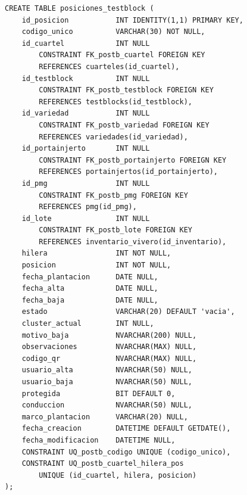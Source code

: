\documentclass[12pt,a4paper,twoside]{report}
\begin{document}
\begin{lstlisting}[style=sqlstyle, caption={posiciones\_testblock}]
CREATE TABLE posiciones_testblock (
    id_posicion           INT IDENTITY(1,1) PRIMARY KEY,
    codigo_unico          VARCHAR(30) NOT NULL,
    id_cuartel            INT NULL
        CONSTRAINT FK_postb_cuartel FOREIGN KEY
        REFERENCES cuarteles(id_cuartel),
    id_testblock          INT NULL
        CONSTRAINT FK_postb_testblock FOREIGN KEY
        REFERENCES testblocks(id_testblock),
    id_variedad           INT NULL
        CONSTRAINT FK_postb_variedad FOREIGN KEY
        REFERENCES variedades(id_variedad),
    id_portainjerto       INT NULL
        CONSTRAINT FK_postb_portainjerto FOREIGN KEY
        REFERENCES portainjertos(id_portainjerto),
    id_pmg                INT NULL
        CONSTRAINT FK_postb_pmg FOREIGN KEY
        REFERENCES pmg(id_pmg),
    id_lote               INT NULL
        CONSTRAINT FK_postb_lote FOREIGN KEY
        REFERENCES inventario_vivero(id_inventario),
    hilera                INT NOT NULL,
    posicion              INT NOT NULL,
    fecha_plantacion      DATE NULL,
    fecha_alta            DATE NULL,
    fecha_baja            DATE NULL,
    estado                VARCHAR(20) DEFAULT 'vacia',
    cluster_actual        INT NULL,
    motivo_baja           NVARCHAR(200) NULL,
    observaciones         NVARCHAR(MAX) NULL,
    codigo_qr             NVARCHAR(MAX) NULL,
    usuario_alta          NVARCHAR(50) NULL,
    usuario_baja          NVARCHAR(50) NULL,
    protegida             BIT DEFAULT 0,
    conduccion            NVARCHAR(50) NULL,
    marco_plantacion      VARCHAR(20) NULL,
    fecha_creacion        DATETIME DEFAULT GETDATE(),
    fecha_modificacion    DATETIME NULL,
    CONSTRAINT UQ_postb_codigo UNIQUE (codigo_unico),
    CONSTRAINT UQ_postb_cuartel_hilera_pos
        UNIQUE (id_cuartel, hilera, posicion)
);
\end{lstlisting}
\end{document}
